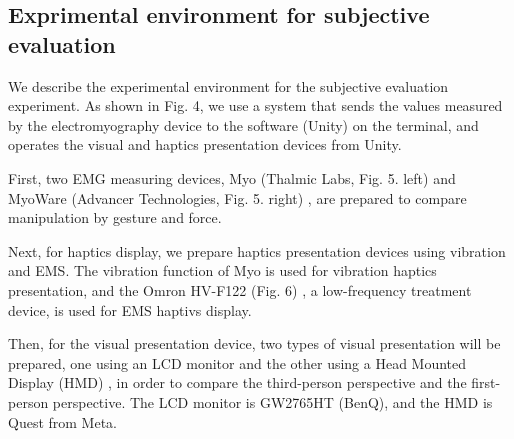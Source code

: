 \documentclass[letterpaper, 10 pt, conference]{ieeeconf}  %
\begin{document}
        \subsection{Exprimental environment for subjective evaluation}
                We describe the experimental environment for the subjective evaluation experiment.
                As shown in Fig. 4, we use a system that sends the values measured by the electromyography device to the software (Unity) on the terminal, and operates the visual and haptics presentation devices from Unity.  

                First, two EMG measuring devices, Myo (Thalmic Labs, Fig. 5. left) and MyoWare (Advancer Technologies, Fig. 5. right) , are prepared to compare manipulation by gesture and force.  

                Next, for haptics display, we prepare haptics presentation devices using vibration and EMS.  
                The vibration function of Myo is used for vibration haptics presentation, and the Omron HV-F122 (Fig. 6) , a low-frequency treatment device, is used for EMS haptivs display.  

                Then, for the visual presentation device, two types of visual presentation will be prepared, one using an LCD monitor and the other using a Head Mounted Display (HMD) , in order to compare the third-person perspective and the first-person perspective.  
                The LCD monitor is GW2765HT (BenQ), and the HMD is Quest from Meta. 
\end{document}
